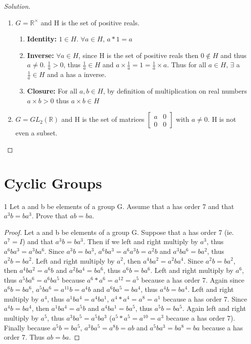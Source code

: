 \documentclass{article}
\newcommand{\R}{\mathbb{R}}
\newenvironment{solution}
{\renewcommand\qedsymbol{$\blacksquare$}\begin{proof}[Solution]}
{\end{proof}}
\begin{document}
\begin{solution}
\begin{enumerate}{}
        \item $G = \R^\times$ and H is the set of positive reals.
        \begin{enumerate}{}
            \item \textbf{Identity: } $1 \in H$. $\forall a \in H$, $a * 1 = a$ 
            \item \textbf{Inverse: } $\forall a \in H$, since H is the set of positive reals then $0 \not \in H$ and thus $a \neq 0$. $\frac{1}{a} > 0$, thus $\frac{1}{a} \in H$ and $a \times \frac{1}{a} = 1 = \frac{1}{a} \times a$. Thus for all $a \in H$, $\exists$ a $\frac{1}{a} \in H$ and a has a inverse.
            \item \textbf{Closure: } For all $a, b \in H$, by definition of multiplication on real numbers $a \times b > 0$ thus $a \times b \in H$
        \end{enumerate}

        \item $G = GL_2(\R)$ and H is the set of matrices $\begin{bmatrix}{}
            a & 0\\
            0 & 0
        \end{bmatrix}$ with $a \neq 0$. H is not even a subset.
    \end{enumerate}
\end{solution}

\section*{Cyclic Groups}
\begin{PROB}{1}\label{Problem 1.}
    Let a and b be elements of a group G. Assume that a has order 7 and that $a^3b = ba^3$. Prove that $ab = ba$.
\end{PROB}
\begin{proof}
    Let a and b be elements of a group G. Suppose that a has order 7 (ie.$a^7 = I$) and that $a^3b = ba^3$. Then if we left and right multiply by $a^3$, thus $a^6ba^3 = a^3ba^6$. Since $a^3b = ba^3$, $a^6ba^3 = a^6a^3b = a^2b$ and $a^3ba^6 = ba^2$, thus $a^2b = ba^2$. Left and right multiply by $a^2$, then $a^4ba^2 = a^2ba^4$. Since $a^2b = ba^2$, then $a^4ba^2 = a^6b$ and $a^2ba^4=ba^6$, thus $a^6b=ba^6$. Left and right multiply by $a^6$, thus $a^5ba^6 = a^6ba^5$ because $a^6 * a^6 = a^{12} = a^5$ because a has order 7. Again since $a^6b=ba^6$, $a^5ba^6 = a^11b=a^4b$ and $a^6ba^5 = ba^4$, thus $a^4b = ba^4$. Left and right multiply by $a^4$, thus $a^1ba^4 = a^4ba^1$, $a^4*a^4 = a^8 = a^1$ because a has order 7. Since $a^4b = ba^4$, then $a^1ba^4 = a^5b$ and $ a^4ba^1 = ba^5$, thus $a^5b = ba^5$. Again left and right multiply by $a^5$, thus $a^3ba^5 = a^5ba^3$ ($a^5*a^5 = a^{10} = a^3$ because a has order 7). Finally because $a^5b = ba^5$, $a^3ba^5 = a^8b = ab$ and $a^5ba^3 = ba^8 = ba$ because a has order 7. Thus $ab = ba$.
\end{proof}
\end{document}
